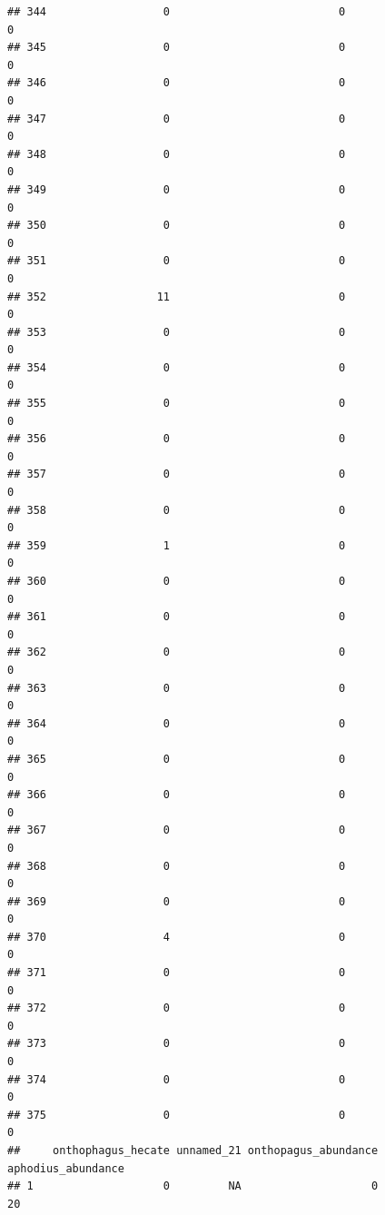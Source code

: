 \documentclass[
]{article}
\begin{document}
\begin{verbatim}
## 344                  0                          0                       0
## 345                  0                          0                       0
## 346                  0                          0                       0
## 347                  0                          0                       0
## 348                  0                          0                       0
## 349                  0                          0                       0
## 350                  0                          0                       0
## 351                  0                          0                       0
## 352                 11                          0                       0
## 353                  0                          0                       0
## 354                  0                          0                       0
## 355                  0                          0                       0
## 356                  0                          0                       0
## 357                  0                          0                       0
## 358                  0                          0                       0
## 359                  1                          0                       0
## 360                  0                          0                       0
## 361                  0                          0                       0
## 362                  0                          0                       0
## 363                  0                          0                       0
## 364                  0                          0                       0
## 365                  0                          0                       0
## 366                  0                          0                       0
## 367                  0                          0                       0
## 368                  0                          0                       0
## 369                  0                          0                       0
## 370                  4                          0                       0
## 371                  0                          0                       0
## 372                  0                          0                       0
## 373                  0                          0                       0
## 374                  0                          0                       0
## 375                  0                          0                       0
##     onthophagus_hecate unnamed_21 onthopagus_abundance aphodius_abundance
## 1                    0         NA                    0                 20

\end{verbatim}
\end{document}
